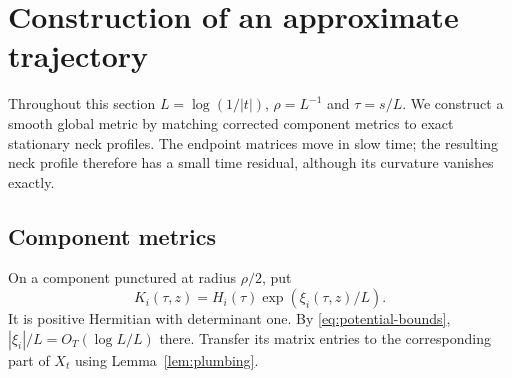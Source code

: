 \section{Construction of an approximate trajectory}\label{sec:approximation}

Throughout this section $L=\log(1/|t|)$, $\rho=L^{-1}$ and $\tau=s/L$.
We construct a smooth global metric by matching corrected component
metrics to exact stationary neck profiles. The endpoint matrices move
in slow time; the resulting neck profile therefore has a small time
residual, although its curvature vanishes exactly.

\subsection{Component metrics}
On a component punctured at radius $\rho/2$, put
\begin{equation}\label{eq:component-metric}
 K_i(\tau,z)=H_i(\tau)\exp(\xi_i(\tau,z)/L).
\end{equation}
It is positive Hermitian with determinant one. By
\eqref{eq:potential-bounds}, $|\xi_i|/L=O_T(\log L/L)$ there.
Transfer its matrix entries to the corresponding part of $X_t$
using Lemma~\ref{lem:plumbing}.


